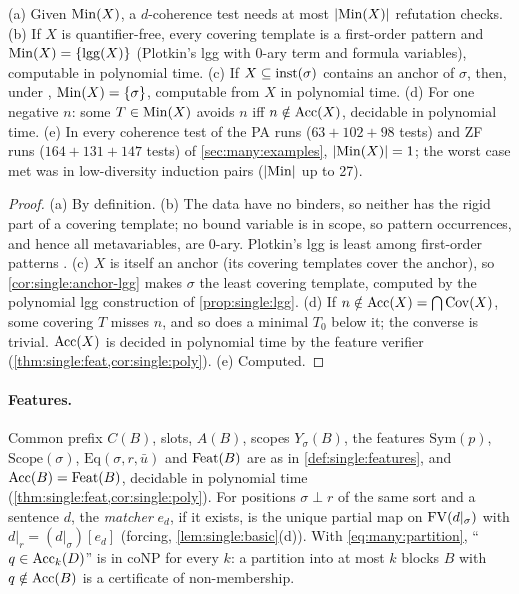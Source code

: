 \begin{proposition}\label{prop:many:testcost}
(a) Given $\mathrm{Min}(X)$, a $d$-coherence test needs at most $|\mathrm{Min}(X)|$ refutation checks. (b) If $X$ is quantifier-free, every
covering template is a first-order pattern and $\mathrm{Min}(X)=\{\mathrm{lgg}(X)\}$ (Plotkin's lgg with 0-ary term and formula variables),
computable in polynomial time. (c) If $X\subseteq\mathrm{inst}(\sigma)$ contains an anchor of $\sigma$, then, under \Rich,
$\mathrm{Min}(X)=\{\sigma\}$, computable from $X$ in polynomial time. (d) For one negative $n$: some $T\in\mathrm{Min}(X)$ avoids $n$ iff
$n\notin\mathrm{Acc}(X)$, decidable in polynomial time. (e) In every coherence test of the PA runs ($63+102+98$ tests) and ZF runs
($164+131+147$ tests) of \cref{sec:many:examples}, $|\mathrm{Min}(X)|=1$; the worst case met was in low-diversity induction pairs
($|\mathrm{Min}|$ up to 27).
\end{proposition}
\begin{proof}
(a) By definition. (b) The data have no binders, so neither has the rigid part of a covering template; no bound variable
is in scope, so pattern occurrences, and hence all metavariables, are 0-ary. Plotkin's lgg is least among first-order
patterns \citep{plotkin1970note,reynolds1970transformational}. (c) $X$ is itself an anchor (its covering templates cover
the anchor), so \cref{cor:single:anchor-lgg} makes $\sigma$ the least covering template, computed by the polynomial lgg
construction of \cref{prop:single:lgg}. (d) If $n\notin\mathrm{Acc}(X)=\bigcap\mathrm{Cov}(X)$, some covering $T$ misses
$n$, and so does a minimal $T_0$ below it; the converse is trivial. $\mathrm{Acc}(X)$ is decided in polynomial time by the feature
verifier (\cref{thm:single:feat,cor:single:poly}). (e) Computed.
\end{proof}

\paragraph{Features.} Common prefix $C(B)$, slots, $A(B)$, scopes $Y_\sigma(B)$, the features $\mathrm{Sym}(p)$,
$\mathrm{Scope}(\sigma)$, $\mathrm{Eq}(\sigma,r,\bar u)$ and $\mathrm{Feat}(B)$ are as in \cref{def:single:features}, and
$\mathrm{Acc}(B)=\mathrm{Feat}(B)$, decidable in polynomial time (\cref{thm:single:feat,cor:single:poly}). For positions $\sigma\perp r$ of the
same sort and a sentence $d$, the \emph{matcher} $e_d$, if it exists, is the unique partial map on $\mathrm{FV}(d|_\sigma)$ with
$d|_r=(d|_\sigma)[e_d]$ (forcing, \cref{lem:single:basic}(d)). With \eqref{eq:many:partition}, ``$q\in\mathrm{Acc}_k(D)$'' is in
coNP for every $k$: a partition into at most $k$ blocks $B$ with $q\notin\mathrm{Acc}(B)$ is a certificate of non-membership.

